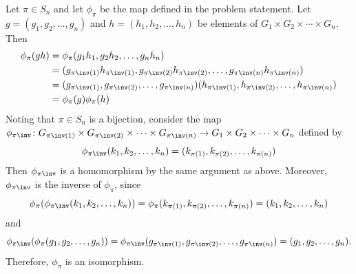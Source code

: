 \begin{sol}
    Let $\pi \in S_n$ and let $\phi_\pi$ be the map defined in the problem statement.
	Let $g = (g_1, g_2, \ldots, g_n)$ and $h = (h_1, h_2, \ldots, h_n)$ be elements of $G_1 \times G_2 \times \cdots \times G_n$.
	Then
    \begin{align*}
        \phi_\pi(gh) & = \phi_\pi(g_1h_1, g_2h_2, \ldots, g_nh_n) \\
        & = (g_{\pi\inv(1)}h_{\pi\inv(1)}, g_{\pi\inv(2)}h_{\pi\inv(2)}, \ldots, g_{\pi\inv(n)}h_{\pi\inv(n)}) \\
        & = (g_{\pi\inv(1)}, g_{\pi\inv(2)}, \ldots, g_{\pi\inv(n)})(h_{\pi\inv(1)}, h_{\pi\inv(2)}, \ldots, h_{\pi\inv(n)}) \\
        & = \phi_\pi(g)\phi_\pi(h)
    \end{align*}
    Noting that $\pi \in S_n$ is a bijection, consider the map $\phi_{\pi\inv} \colon G_{\pi\inv(1)} \times G_{\pi\inv(2)} \times \cdots \times G_{\pi\inv(n)} \to G_1 \times G_2 \times \cdots \times G_n$ defined by
    \[
    	\phi_{\pi\inv}(k_1, k_2, \ldots, k_n) = (k_{\pi(1)}, k_{\pi(2)}, \ldots, k_{\pi(n)})
    \]
    Then $\phi_{\pi\inv}$ is a homomorphism by the same argument as above.
	Moreover, $\phi_{\pi\inv}$ is the inverse of $\phi_\pi$, since
    \[
    	\phi_\pi(\phi_{\pi\inv}(k_1, k_2, \ldots, k_n)) = \phi_\pi(k_{\pi(1)}, k_{\pi(2)}, \ldots, k_{\pi(n)}) = (k_1, k_2, \ldots, k_n)
    \]
    and
    \[
    	\phi_{\pi\inv}(\phi_\pi(g_1, g_2, \ldots, g_n)) = \phi_{\pi\inv}(g_{\pi\inv(1)}, g_{\pi\inv(2)}, \ldots, g_{\pi\inv(n)}) = (g_1, g_2, \ldots, g_n).
    \]
    Therefore, $\phi_\pi$ is an isomorphism.
\end{sol}

